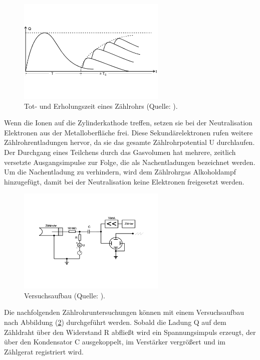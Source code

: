 \begin{figure}
            \centering
               \includegraphics[height=5cm]{totzeit.pdf}
               \caption{Tot- und Erholungszeit eines Zählrohrs (Quelle: \cite{V703}).}
               \label{fig:totzeit}
        \end{figure}

\noindent
Wenn die Ionen auf die Zylinderkathode treffen, setzen sie bei der Neutralisation Elektronen aus der Metalloberfläche frei.
Diese Sekundärelektronen rufen weitere Zählrohrentladungen hervor, da sie das gesamte Zählrohrpotential U durchlaufen.
Der Durchgang eines Teilchens durch das Gasvolumen hat mehrere, zeitlich versetzte Ausgangsimpulse zur Folge, die als Nachentladungen bezeichnet werden.
Um die Nachentladung zu verhindern, wird dem Zählrohrgas Alkoholdampf hinzugefügt, damit bei der Neutralisation keine Elektronen freigesetzt werden.   

\newpage
\begin{figure}
            \centering
               \includegraphics[height=5cm]{aufbau.pdf}
               \caption{Versuchsaufbau (Quelle: \cite{V703}).}
               \label{fig:aufbau}
        \end{figure}

\noindent
Die nachfolgenden Zählrohruntersuchungen können mit einem Versuchsaufbau nach Abbildung (\ref{fig:aufbau}) durchgeführt werden.
Sobald die Ladung Q auf dem Zähldraht über den Widerstand R abfließt wird ein Spannungsimpuls erzeugt, 
der über den Kondensator C ausgekoppelt, im Verstärker vergrößert und im Zählgerat registriert wird.


